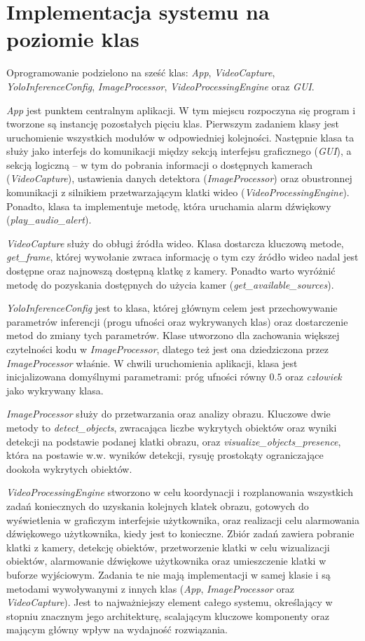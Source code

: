 \section{Implementacja systemu na poziomie klas}
Oprogramowanie podzielono na sześć klas: \emph{App}, \emph{VideoCapture}, \emph{YoloInferenceConfig}, \emph{ImageProcessor}, \emph{VideoProcessingEngine} oraz \emph{GUI}.

\emph{App} jest punktem centralnym aplikacji. W tym miejscu rozpoczyna się program i tworzone są instancję pozostałych pięciu klas. Pierwszym zadaniem klasy jest uruchomienie wszystkich modułów w odpowiedniej kolejności. Następnie klasa ta służy jako interfejs do komunikacji między sekcją interfejsu graficznego (\emph{GUI}), a sekcją logiczną -- w tym do pobrania informacji o dostępnych kamerach (\emph{VideoCapture}), ustawienia danych detektora (\emph{ImageProcessor}) oraz obustronnej komunikacji z silnikiem przetwarzającym klatki wideo (\emph{VideoProcessingEngine}). 
Ponadto, klasa ta implementuje metodę, która uruchamia alarm dźwiękowy (\emph{{play\_audio\_alert}}). 

\emph{VideoCapture} służy do obługi źródła wideo. Klasa dostarcza kluczową metode, \emph{get\_frame}, której wywołanie zwraca informację o tym czy źródło wideo nadal jest dostępne oraz najnowszą dostępną klatkę z kamery. Ponadto warto wyróżnić metodę do pozyskania dostępnych do użycia kamer (\emph{get\_available\_sources}).

\emph{YoloInferenceConfig} jest to klasa, której głównym celem jest przechowywanie parametrów inferencji (progu ufności oraz wykrywanych klas) oraz dostarczenie metod do zmiany tych parametrów. Klase utworzono dla zachowania większej czytelności kodu w \emph{ImageProcessor}, dlatego też jest ona dziedziczona przez \emph{ImageProcessor} właśnie. W chwili uruchomienia aplikacji, klasa jest inicjalizowana domyślnymi parametrami: próg ufności równy $0.5$ oraz \emph{człowiek} jako wykrywany klasa. 

\emph{ImageProcessor} służy do przetwarzania oraz analizy obrazu. Kluczowe dwie metody to \emph{detect\_objects}, zwracająca liczbe wykrytych obiektów oraz wyniki detekcji na podstawie podanej klatki obrazu, oraz \emph{visualize\_objects\_presence}, która na postawie w.w. wyników detekcji, rysuję prostokąty ograniczające dookoła wykrytych obiektów.

\emph{VideoProcessingEngine} stworzono w celu koordynacji i rozplanowania wszystkich zadań koniecznych do uzyskania kolejnych klatek obrazu, gotowych do wyświetlenia w graficzym interfejsie użytkownika, oraz realizacji celu alarmowania dźwiękowego użytkownika, kiedy jest to konieczne. Zbiór zadań zawiera pobranie klatki z kamery, detekcję obiektów, przetworzenie klatki w celu wizualizacji obiektów, alarmowanie dźwiękowe użytkownika oraz umieszczenie klatki w buforze wyjściowym. Zadania te nie mają implementacji w samej klasie i są metodami wywoływanymi z innych klas (\emph{App}, \emph{ImageProcessor} oraz \emph{VideoCapture}). Jest to najważniejszy element całego systemu, określający w stopniu znacznym jego architekturę, scalającym kluczowe komponenty oraz mającym główny wpływ na wydajność rozwiązania.

